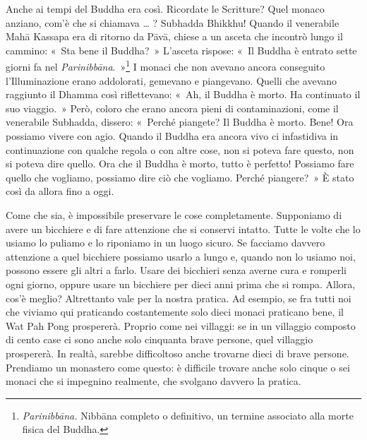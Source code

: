 Anche ai tempi del Buddha era così. Ricordate le Scritture? Quel monaco
anziano, com'è che si chiamava \ldots{} ? Subhadda Bhikkhu! Quando il
venerabile Mahā Kassapa era di ritorno da Pāvā, chiese a un asceta che
incontrò lungo il cammino: «~Sta bene il Buddha?~» L'asceta rispose:
«~Il Buddha è entrato sette giorni fa nel
\emph{Parinibbāna}.~»\footnote{\emph{Parinibbāna.} Nibbāna
  completo o definitivo, un termine associato alla morte fisica del
  Buddha.} I monaci che non avevano ancora conseguito l'Illuminazione
erano addolorati, gemevano e piangevano. Quelli che avevano raggiunto il
Dhamma così riflettevano: «~Ah, il Buddha è morto. Ha continuato il suo
viaggio.~» Però, coloro che erano ancora pieni di contaminazioni, come
il venerabile Subhadda, dissero: «~Perché piangete? Il Buddha è morto.
Bene! Ora possiamo vivere con agio. Quando il Buddha era ancora vivo ci
infastidiva in continuazione con qualche regola o con altre cose, non si
poteva fare questo, non si poteva dire quello. Ora che il Buddha è
morto, tutto è perfetto! Possiamo fare quello che vogliamo, possiamo
dire ciò che vogliamo. Perché piangere?~» È stato così da allora fino a
oggi.

Come che sia, è impossibile preservare le cose completamente. Supponiamo
di avere un bicchiere e di fare attenzione che si conservi intatto.
Tutte le volte che lo usiamo lo puliamo e lo riponiamo in un luogo
sicuro. Se facciamo davvero attenzione a quel bicchiere possiamo usarlo
a lungo e, quando non lo usiamo noi, possono essere gli altri a farlo.
Usare dei bicchieri senza averne cura e romperli ogni giorno, oppure
usare un bicchiere per dieci anni prima che si rompa. Allora, cos'è
meglio? Altrettanto vale per la nostra pratica. Ad esempio, se fra tutti
noi che viviamo qui praticando costantemente solo dieci monaci praticano
bene, il Wat Pah Pong prospererà. Proprio come nei villaggi: se in un
villaggio composto di cento case ci sono anche solo cinquanta brave
persone, quel villaggio prospererà. In realtà, sarebbe difficoltoso
anche trovarne dieci di brave persone. Prendiamo un monastero come
questo: è difficile trovare anche solo cinque o sei monaci che si
impegnino realmente, che svolgano davvero la pratica.

